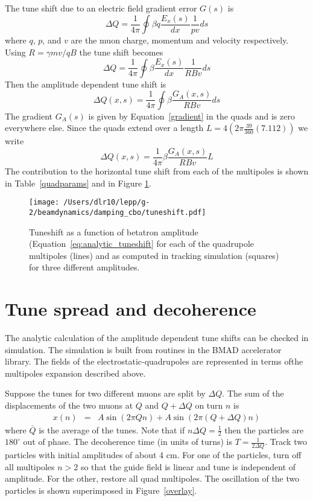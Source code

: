 \documentclass[10pt]{article}
\begin{document}
The tune shift due to an electric field gradient error $G(s)$ is $$\Delta Q = \frac{1}{4\pi}\oint\beta q\frac{E_x(s)}{dx}\frac{1}{pv}ds$$
where $q$, $p$, and $v$ are the muon charge, momentum and velocity respectively. Using $R=\gamma mv/qB$ 
the tune shift becomes $$\Delta Q = \frac{1}{4\pi}\oint\beta \frac{E_x(s)}{dx}\frac{1}{RBv}ds$$
Then the amplitude dependent tune shift is 
$$\Delta Q(x,s) = \frac{1}{4\pi}\oint \beta \frac{ G_A(x,s)}{RBv} ds$$
The gradient $G_A(s)$ is given by Equation~\ref{gradient} in the quads and is zero everywhere else.
Since the quads extend over a length
$L = 4(2\pi\frac{39}{360}(7.112))$ we write
\begin{equation}
\Delta Q(x,s) = \frac{1}{4\pi} \beta \frac{ G_A(x,s)}{RBv} L\label{eq:analytic_tuneshift}
\end{equation}
The contribution to the horizontal tune shift from each of the multipoles is shown in Table~\ref{quadparams} and in Figure \ref{mp_tuneshift}.
\begin{figure}[htbp] %
   \centering
   \texttt{[image: /Users/dlr10/lepp/g-2/beamdynamics/damping\_cbo/tuneshift.pdf]} 
   \caption{Tuneshift as a function of betatron amplitude (Equation~\ref{eq:analytic_tuneshift} for each of the quadrupole multipoles (lines) and as computed in tracking
simulation (squares) for
three different amplitudes.
 \label{mp_tuneshift}}
\end{figure}
\section{Tune spread and decoherence}
The analytic calculation of the amplitude dependent tune shifts can be checked in simulation. The simulation is built from routines in the BMAD accelerator library.
The fields of the electrostatic-quadrupoles are represented in terms ofthe multipoles expansion described above. 

Suppose the tunes for two different muons are split by $\Delta Q$.
The sum of the displacements of the two muons at $Q$ and $Q +\Delta Q$ on turn $n$ is
\begin{eqnarray*}
x(n)&=&A\sin (2\pi Q n) + A\sin(2\pi (Q+\Delta Q)n)
\end{eqnarray*}
where $\bar Q$ is the average of the tunes. Note that if $n\Delta Q = \frac{1}{2}$ then the particles are $180^\circ$ out of phase. The decoherence time (in units of turns) is
$T = \frac{1}{2\Delta Q}$.
Track two particles with initial amplitudes of about 4 cm. For one of the particles, turn off all multipoles $n>2$ so that the guide field is linear and tune is independent
of amplitude. For the other, restore all quad multipoles. The oscillation of the two particles is shown superimposed in Figure~\ref{overlay}.
\end{document}
